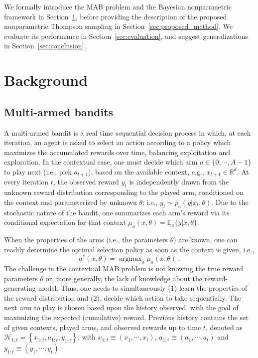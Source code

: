 \documentclass{article}
\def \Real{{\mathbb R}}
\newcommand{\ie}{i.e., }
\newcommand{\argmax}{\mathop{\mathrm{argmax}}}
\begin{document}
We formally introduce the MAB problem and the Bayesian nonparametric framework in Section~\ref{sec:background}, before providing the description of the proposed nonparametric Thompson sampling in Section~\ref{sec:proposed_method}. We evaluate its performance in Section~\ref{sec:evaluation}, and suggest generalizations in Section~\ref{sec:conclusion}.

\section{Background}
\label{sec:background}

\subsection{Multi-armed bandits}
\label{ssec:background_mab}
A multi-armed bandit is a real time sequential decision process in which, at each iteration, an agent is asked to select an action according to a policy which maximizes the accumulated rewards over time, balancing exploitation and exploration. In the contextual case, one must decide which arm $a\in\{0,\cdots,A-1\}$ to play next (\ie pick $a_{t+1}$), based on the available context, e.g.,  $x_{t+1}\in\Real^{d}$. At every iteration  $t$, the observed reward $y_t$ is independently drawn from the unknown reward distribution corresponding to the played arm, conditioned on the context and parameterized by unknown $\theta$; \ie $y_t\sim p_{a}(y|x_t,\theta)$. Due to the stochastic nature of the bandit, one summarizes each arm's reward via its conditional expectation for that context $\mu_{a}(x,\theta)=\mathbb{E}_{a}\{y|x,\theta\}$.

When the properties of the arms (\ie the parameters $\theta$) are known, one can readily determine the optimal selection policy as soon as the context is given, \ie
\begin{equation}
a^*(x,\theta)=\argmax_{a}\mu_{a}(x,\theta) \; .
\end{equation}
The challenge in the contextual MAB problem is not knowing the true reward parameters $\theta$ or, more generally, the lack of knowledge about the reward-generating model. Thus, one needs to simultaneously (1) learn the properties of the reward distribution and (2), decide which action to take sequentially. The next arm to play is chosen based upon the history observed, with the goal of maximizing the expected (cumulative) reward. Previous history contains the set of given contexts, played arms, and observed rewards up to time $t$, denoted as $\mathcal{H}_{1:t}=\left\{x_{1:t}, a_{1:t}, y_{1:t}\right\}$, with $x_{1:t} \equiv (x_1, \cdots , x_t)$, $a_{1:t} \equiv (a_1, \cdots , a_t)$ and $y_{1:t} \equiv (y_1, \cdots , y_t)$. 
\end{document}
